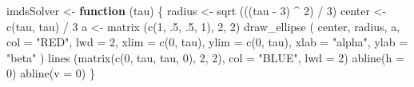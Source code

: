 \documentclass[
  12pt,
  letterpaper,
  DIV=11,
  numbers=noendperiod]{scrreprt}
\newenvironment{Shaded}{\begin{snugshade}}{\end{snugshade}}
\newcommand{\AttributeTok}[1]{\textcolor[rgb]{0.40,0.45,0.13}{#1}}
\newcommand{\ControlFlowTok}[1]{\textcolor[rgb]{0.00,0.23,0.31}{\textbf{#1}}}
\newcommand{\DecValTok}[1]{\textcolor[rgb]{0.68,0.00,0.00}{#1}}
\newcommand{\FunctionTok}[1]{\textcolor[rgb]{0.28,0.35,0.67}{#1}}
\newcommand{\NormalTok}[1]{\textcolor[rgb]{0.00,0.23,0.31}{#1}}
\newcommand{\OtherTok}[1]{\textcolor[rgb]{0.00,0.23,0.31}{#1}}
\newcommand{\SpecialCharTok}[1]{\textcolor[rgb]{0.37,0.37,0.37}{#1}}
\newcommand{\StringTok}[1]{\textcolor[rgb]{0.13,0.47,0.30}{#1}}
\theoremstyle{remark}
\begin{document}
\begin{Shaded}
\begin{Highlighting}[]
\NormalTok{imdsSolver }\OtherTok{\textless{}{-}} \ControlFlowTok{function}\NormalTok{ (tau) \{}
\NormalTok{  radius }\OtherTok{\textless{}{-}} \FunctionTok{sqrt}\NormalTok{ (((tau }\SpecialCharTok{{-}} \DecValTok{3}\NormalTok{) }\SpecialCharTok{\^{}} \DecValTok{2}\NormalTok{) }\SpecialCharTok{/} \DecValTok{3}\NormalTok{)}
\NormalTok{  center }\OtherTok{\textless{}{-}} \FunctionTok{c}\NormalTok{(tau, tau) }\SpecialCharTok{/} \DecValTok{3}
\NormalTok{  a }\OtherTok{\textless{}{-}} \FunctionTok{matrix}\NormalTok{ (}\FunctionTok{c}\NormalTok{(}\DecValTok{1}\NormalTok{, .}\DecValTok{5}\NormalTok{, .}\DecValTok{5}\NormalTok{, }\DecValTok{1}\NormalTok{), }\DecValTok{2}\NormalTok{, }\DecValTok{2}\NormalTok{)}
  \FunctionTok{draw\_ellipse}\NormalTok{ (}
\NormalTok{    center,}
\NormalTok{    radius,}
\NormalTok{    a,}
    \AttributeTok{col =} \StringTok{"RED"}\NormalTok{,}
    \AttributeTok{lwd =} \DecValTok{2}\NormalTok{,}
    \AttributeTok{xlim =} \FunctionTok{c}\NormalTok{(}\DecValTok{0}\NormalTok{, tau),}
    \AttributeTok{ylim =} \FunctionTok{c}\NormalTok{(}\DecValTok{0}\NormalTok{, tau),}
    \AttributeTok{xlab =} \StringTok{"alpha"}\NormalTok{,}
    \AttributeTok{ylab =} \StringTok{"beta"}
\NormalTok{  )}
  \FunctionTok{lines}\NormalTok{ (}\FunctionTok{matrix}\NormalTok{(}\FunctionTok{c}\NormalTok{(}\DecValTok{0}\NormalTok{, tau, tau, }\DecValTok{0}\NormalTok{), }\DecValTok{2}\NormalTok{, }\DecValTok{2}\NormalTok{), }\AttributeTok{col =} \StringTok{"BLUE"}\NormalTok{, }\AttributeTok{lwd =} \DecValTok{2}\NormalTok{)}
  \FunctionTok{abline}\NormalTok{(}\AttributeTok{h =} \DecValTok{0}\NormalTok{)}
  \FunctionTok{abline}\NormalTok{(}\AttributeTok{v =} \DecValTok{0}\NormalTok{)}
\NormalTok{\}}


\end{Highlighting}
\end{Shaded}
\end{document}
